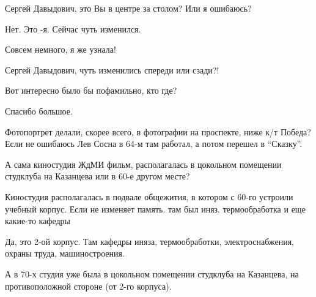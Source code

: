  
 
 
 
 

\qqSecCmt


Сергей Давыдович, это Вы в центре за столом? Или я ошибаюсь?

\begin{itemize} %

Нет. Это -я. Сейчас чуть изменился.


Совсем немного, я же узнала!

Сергей Давыдович, чуть изменились спереди или сзади?!
\end{itemize} %


Вот интересно было бы пофамильно, кто где?

\begin{itemize} %

Спасибо большое.

Фотопортрет делали, скорее всего, в фотографии на проспекте, ниже к/т Победа?
Если не ошибаюсь Лев Сосна в 64-м там работал, а потом перешел в \enquote{Сказку}.

А сама киностудия ЖдМИ фильм, располагалась в цокольном помещении студклуба на Казанцева или в 60-е другом месте?


Киностудия располагалась в подвале общежития, в котором с 60-го устроили
учебный корпус. Если не изменяет память. там был иняз. термообработка и еще
какие-то кафедры


Да, это 2-ой корпус. Там кафедры иняза, термообработки, электроснабжения, охраны труда, машиностроения.

А в 70-х студия уже была в цокольном помещении студклуба на Казанцева, на противоположной стороне (от 2-го корпуса).

\end{itemize} %

